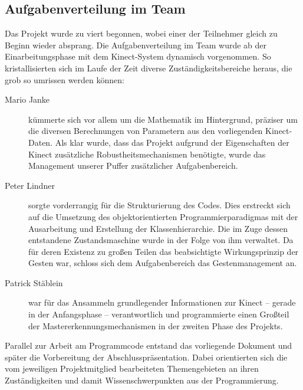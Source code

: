 	\subsection{Aufgabenverteilung im Team}
	Das Projekt wurde zu viert begonnen, wobei einer der Teilnehmer gleich zu Beginn wieder absprang. Die Aufgabenverteilung im Team wurde ab der Einarbeitungsphase mit dem Kinect-System dynamisch vorgenommen. So kristallisierten sich im Laufe der Zeit diverse Zuständigkeitsbereiche heraus, die grob so umrissen werden können:
	\begin{description}
		\item[Mario Janke] kümmerte sich vor allem um die Mathematik im Hintergrund, präziser um die diversen Berechnungen von Parametern aus den vorliegenden Kinect-Daten. Als klar wurde, dass das Projekt aufgrund der Eigenschaften der Kinect zusätzliche Robustheitsmechanismen benötigte, wurde das Management unserer Puffer zusätzlicher Aufgabenbereich.
		\item[Peter Lindner] sorgte vorderrangig für die Strukturierung des Codes. Dies erstreckt sich auf die Umsetzung des objektorientierten Programmierparadigmas mit der Ausarbeitung und Erstellung der Klassenhierarchie. Die im Zuge dessen entstandene Zustandsmaschine wurde in der Folge von ihm verwaltet. Da für deren Existenz zu großen Teilen das beabsichtigte Wirkungsprinzip der Gesten war, schloss sich dem Aufgabenbereich das Gestenmanagement an.
		\item[Patrick Stäblein] war für das Ansammeln grundlegender Informationen zur Kinect -- gerade in der Anfangsphase -- verantwortlich und programmierte einen Großteil der Mastererkennungsmechanismen in der zweiten Phase des Projekts.
	\end{description}
	Parallel zur Arbeit am Programmcode entstand das vorliegende Dokument und später die Vorbereitung der Abschlusspräsentation. Dabei orientierten sich die vom jeweiligen Projektmitglied bearbeiteten Themengebieten an ihren Zuständigkeiten und damit Wissenschwerpunkten aus der Programmierung.
